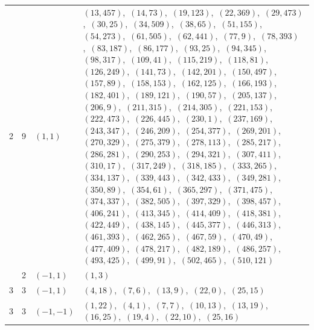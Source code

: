 \documentclass[11pt]{article}
\begin{document}
\begin{longtable}{@{}rrl>{\raggedright\arraybackslash}p{}@{}}
2 & 9 & $(1,1)$ & $(13,457)$,\allowbreak\ $(14,73)$,\allowbreak\ $(19,123)$,\allowbreak\ $(22,369)$,\allowbreak\ $(29,473)$,\allowbreak\ $(30,25)$,\allowbreak\ $(34,509)$,\allowbreak\ $(38,65)$,\allowbreak\ $(51,155)$,\allowbreak\ $(54,273)$,\allowbreak\ $(61,505)$,\allowbreak\ $(62,441)$,\allowbreak\ $(77,9)$,\allowbreak\ $(78,393)$,\allowbreak\ $(83,187)$,\allowbreak\ $(86,177)$,\allowbreak\ $(93,25)$,\allowbreak\ $(94,345)$,\allowbreak\ $(98,317)$,\allowbreak\ $(109,41)$,\allowbreak\ $(115,219)$,\allowbreak\ $(118,81)$,\allowbreak\ $(126,249)$,\allowbreak\ $(141,73)$,\allowbreak\ $(142,201)$,\allowbreak\ $(150,497)$,\allowbreak\ $(157,89)$,\allowbreak\ $(158,153)$,\allowbreak\ $(162,125)$,\allowbreak\ $(166,193)$,\allowbreak\ $(182,401)$,\allowbreak\ $(189,121)$,\allowbreak\ $(190,57)$,\allowbreak\ $(205,137)$,\allowbreak\ $(206,9)$,\allowbreak\ $(211,315)$,\allowbreak\ $(214,305)$,\allowbreak\ $(221,153)$,\allowbreak\ $(222,473)$,\allowbreak\ $(226,445)$,\allowbreak\ $(230,1)$,\allowbreak\ $(237,169)$,\allowbreak\ $(243,347)$,\allowbreak\ $(246,209)$,\allowbreak\ $(254,377)$,\allowbreak\ $(269,201)$,\allowbreak\ $(270,329)$,\allowbreak\ $(275,379)$,\allowbreak\ $(278,113)$,\allowbreak\ $(285,217)$,\allowbreak\ $(286,281)$,\allowbreak\ $(290,253)$,\allowbreak\ $(294,321)$,\allowbreak\ $(307,411)$,\allowbreak\ $(310,17)$,\allowbreak\ $(317,249)$,\allowbreak\ $(318,185)$,\allowbreak\ $(333,265)$,\allowbreak\ $(334,137)$,\allowbreak\ $(339,443)$,\allowbreak\ $(342,433)$,\allowbreak\ $(349,281)$,\allowbreak\ $(350,89)$,\allowbreak\ $(354,61)$,\allowbreak\ $(365,297)$,\allowbreak\ $(371,475)$,\allowbreak\ $(374,337)$,\allowbreak\ $(382,505)$,\allowbreak\ $(397,329)$,\allowbreak\ $(398,457)$,\allowbreak\ $(406,241)$,\allowbreak\ $(413,345)$,\allowbreak\ $(414,409)$,\allowbreak\ $(418,381)$,\allowbreak\ $(422,449)$,\allowbreak\ $(438,145)$,\allowbreak\ $(445,377)$,\allowbreak\ $(446,313)$,\allowbreak\ $(461,393)$,\allowbreak\ $(462,265)$,\allowbreak\ $(467,59)$,\allowbreak\ $(470,49)$,\allowbreak\ $(477,409)$,\allowbreak\ $(478,217)$,\allowbreak\ $(482,189)$,\allowbreak\ $(486,257)$,\allowbreak\ $(493,425)$,\allowbreak\ $(499,91)$,\allowbreak\ $(502,465)$,\allowbreak\ $(510,121)$\\
\addlinespace[3pt]
3 & 2 & $(-1,1)$ & $(1,3)$\\
3 & 3 & $(-1,1)$ & $(4,18)$,\allowbreak\ $(7,6)$,\allowbreak\ $(13,9)$,\allowbreak\ $(22,0)$,\allowbreak\ $(25,15)$\\
3 & 3 & $(-1,-1)$ & $(1,22)$,\allowbreak\ $(4,1)$,\allowbreak\ $(7,7)$,\allowbreak\ $(10,13)$,\allowbreak\ $(13,19)$,\allowbreak\ $(16,25)$,\allowbreak\ $(19,4)$,\allowbreak\ $(22,10)$,\allowbreak\ $(25,16)$\\

\end{longtable}
\end{document}
